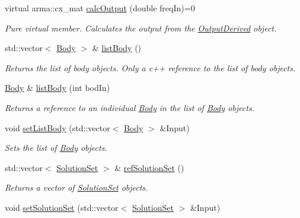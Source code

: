 \begin{DoxyCompactItemize}
virtual arma\-::cx\-\_\-mat \hyperlink{classosea_1_1ofreq_1_1_output_derived_a5600a2c7f70052a8bafce79e15e1aa92}{calc\-Output} (double freq\-In)=0
\begin{DoxyCompactList}\small\item\em Pure virtual member. Calculates the output from the \hyperlink{classosea_1_1ofreq_1_1_output_derived}{Output\-Derived} object. \end{DoxyCompactList}\item 
std\-::vector$<$ \hyperlink{classosea_1_1ofreq_1_1_body}{Body} $>$ \& \hyperlink{classosea_1_1ofreq_1_1_output_derived_a525d8eb4dbed1fd130614521c5d602c1}{list\-Body} ()
\begin{DoxyCompactList}\small\item\em Returns the list of body objects. Only a c++ reference to the list of body objects. \end{DoxyCompactList}\item 
\hyperlink{classosea_1_1ofreq_1_1_body}{Body} \& \hyperlink{classosea_1_1ofreq_1_1_output_derived_abda178375c603cd2d2efcc0c5f9c1f10}{list\-Body} (int bod\-In)
\begin{DoxyCompactList}\small\item\em Returns a reference to an individual \hyperlink{classosea_1_1ofreq_1_1_body}{Body} in the list of \hyperlink{classosea_1_1ofreq_1_1_body}{Body} objects. \end{DoxyCompactList}\item 
void \hyperlink{classosea_1_1ofreq_1_1_output_derived_ac2783796f37019b87df8b2fc58b21d31}{set\-List\-Body} (std\-::vector$<$ \hyperlink{classosea_1_1ofreq_1_1_body}{Body} $>$ \&Input)
\begin{DoxyCompactList}\small\item\em Sets the list of \hyperlink{classosea_1_1ofreq_1_1_body}{Body} objects. \end{DoxyCompactList}\item 
std\-::vector$<$ \hyperlink{classosea_1_1ofreq_1_1_solution_set}{Solution\-Set} $>$ \& \hyperlink{classosea_1_1ofreq_1_1_output_derived_ae94d577f4f58c2c1f8cb2c9c650d505c}{ref\-Solution\-Set} ()
\begin{DoxyCompactList}\small\item\em Returns a vector of \hyperlink{classosea_1_1ofreq_1_1_solution_set}{Solution\-Set} objects. \end{DoxyCompactList}\item 
void \hyperlink{classosea_1_1ofreq_1_1_output_derived_a370efe39cc1262ee1ccb73394c28fc15}{set\-Solution\-Set} (std\-::vector$<$ \hyperlink{classosea_1_1ofreq_1_1_solution_set}{Solution\-Set} $>$ \&Input)

\end{DoxyCompactItemize}
